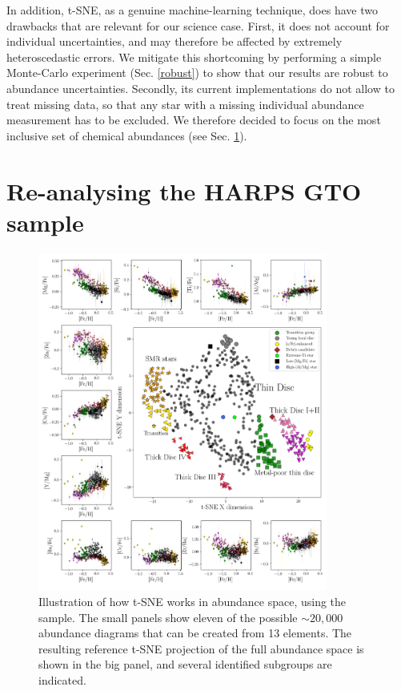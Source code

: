 \documentclass{aa}  %
\begin{document}
In addition, t-SNE, as a genuine machine-learning technique, does have two drawbacks that are relevant for our science case. First, it does not account for individual uncertainties, and may therefore be affected by extremely heteroscedastic errors. We mitigate this shortcoming by performing a simple Monte-Carlo experiment (Sec. \ref{robust}) to show that our results are robust to abundance uncertainties. Secondly, its current implementations do not allow to treat missing data, so that any star with a missing individual abundance measurement has to be excluded. We therefore decided to focus on the most inclusive set of chemical abundances (see Sec. \ref{harps}).

\section{Re-analysing the HARPS GTO sample}\label{harps}

\begin{figure}\centering
 \includegraphics[width=0.85\textwidth]{im/harps_tsne-abundsplot_teffcut.png}
\caption{Illustration of how t-SNE works in abundance space, using the \citet{DelgadoMena2017} sample. The small panels show eleven of the possible $\sim20,000$ abundance diagrams that can be created from 13 elements. The resulting reference t-SNE projection of the full abundance space is shown in the big panel, and several identified subgroups are indicated.}
\label{harps0}
\end{figure}
\end{document}
